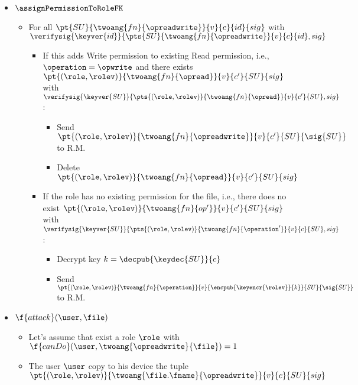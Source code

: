 {\begin{itemize}
        \item \( \assignPermissionToRoleFK \)
        \begin{itemize}
            \item For all \( \pt{SU}{\twoang{fn}{\opreadwrite}}{v}{c}{id}{sig} \) with \( \verifysig{\keyver{id}}{\pts{SU}{\twoang{fn}{\opreadwrite}}{v}{c}{id}, sig} \)
            \begin{itemize}
                \item If this adds Write permission to existing Read permission, i.e., \( \operation = \opwrite \) and there exists \( \pt{(\role, \rolev)}{\twoang{fn}{\opread}}{v}{c'}{SU}{sig} \) with \( \verifysig{\keyver{SU}}{\pts{(\role, \rolev)}{\twoang{fn}{\opread}}{v}{c'}{SU}, sig} \):
                \begin{itemize}
                    \item Send \( \pt{(\role, \rolev)}{\twoang{fn}{\opreadwrite}}{v}{c'}{SU}{\sig{SU}} \) to R.M.
                    \item Delete \( \pt{(\role, \rolev)}{\twoang{fn}{\opread}}{v}{c'}{SU}{sig} \)
                \end{itemize} 
                \item If the role has no existing permission for the file, i.e., there does no exist \( \pt{(\role, \rolev)}{\twoang{fn}{op'}}{v}{c'}{SU}{sig} \) with \( \verifysig{\keyver{SU}}{\pts{(\role, \rolev)}{\twoang{fn}{\operation'}}{v}{c}{SU}, sig} \):
                \begin{itemize}
                    \item Decrypt key \( k = \decpub{\keydec{SU}}{c} \)
                    \item Send \( \pt{(\role, \rolev)}{\twoang{fn}{\operation}}{v}{\encpub{\keyencr{\rolev}}{k}}{SU}{\sig{SU}} \) to R.M.
                \end{itemize}
            \end{itemize}
        \end{itemize}
    \end{itemize}
}{
    \begin{itemize}
        \item \( \f{attack}(\user, \file) \)
        \begin{itemize}
            \item Let's assume that exist a role \(\role\) with \(\f{canDo}(\user, \twoang{\opreadwrite}{\file}) = 1\)
            \item The user \(\user\) copy to his device the tuple \( \pt{(\role, \rolev)}{\twoang{\file.\fname}{\opreadwrite}}{v}{c}{SU}{sig} \)

\end{itemize}
\end{itemize}}
